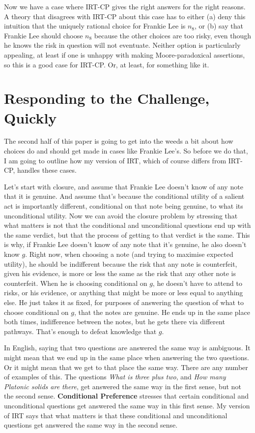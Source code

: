 \documentclass[
  12pt,
]{article}
\begin{document}
Now we have a case where IRT-CP gives the right answers for the right reasons. A theory that disagrees with IRT-CP about this case has to either (a) deny this intuition that the uniquely rational choice for Frankie Lee is \(n_8\), or (b) say that Frankie Lee should choose \(n_8\) because the other choices are too risky, even though he knows the risk in question will not eventuate. Neither option is particularly appealing, at least if one is unhappy with making Moore-paradoxical assertions, so this is a good case for IRT-CP. Or, at least, for something like it.

\hypertarget{tiesresponse}{%
\section{Responding to the Challenge, Quickly}\label{tiesresponse}}

The second half of this paper is going to get into the weeds a bit about how choices do and should get made in cases like Frankie Lee's. So before we do that, I am going to outline how my version of IRT, which of course differs from IRT-CP, handles these cases.

Let's start with closure, and assume that Frankie Lee doesn't know of any note that it is genuine. And assume that's because the conditional utility of a salient act is importantly different, conditional on that note being genuine, to what its unconditional utility. Now we can avoid the closure problem by stressing that what matters is not that the conditional and unconditional questions end up with the same verdict, but that the process of getting to that verdict is the same. This is why, if Frankie Lee doesn't know of any note that it's genuine, he also doesn't know \(g\). Right now, when choosing a note (and trying to maximise expected utility), he should be indifferent because the risk that any note is counterfeit, given his evidence, is more or less the same as the risk that any other note is counterfeit. When he is choosing conditional on \(g\), he doesn't have to attend to risks, or his evidence, or anything that might be more or less equal to anything else. He just takes it as fixed, for purposes of answering the question of what to choose conditional on \(g\), that the notes are genuine. He ends up in the same place both times, indifference between the notes, but he gets there via different pathways. That's enough to defeat knowledge that \(g\).

In English, saying that two questions are answered the same way is ambiguous. It might mean that we end up in the same place when answering the two questions. Or it might mean that we get to that place the same way. There are any number of examples of this. The questions \emph{What is three plus two}, and \emph{How many Platonic solids are there}, get answered the same way in the first sense, but not the second sense. \textbf{Conditional Preference} stresses that certain conditional and unconditional questions get answered the same way in this first sense. My version of IRT says that what matters is that these conditional and unconditional questions get answered the same way in the second sense.
\end{document}
